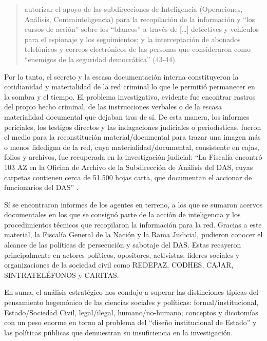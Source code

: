 \documentclass[
  spanish,
  11pt,
  a4paper,
]{scrbook}
\begin{document}
\begin{quote}
autorizar el apoyo de las subdirecciones de Inteligencia (Operaciones,
Análisis, Contrainteligencia) para la recopilación de la información y
``los cursos de acción'' sobre los ``blancos'' a través de {[}\ldots{]}
detectives y vehículos para el espionaje y los seguimientos; y la
interceptación de abonados telefónicos y correos electrónicos de las
personas que consideraron como ``enemigos de la seguridad democrática''
(43-44).
\end{quote}

Por lo tanto, el secreto y la escasa documentación interna constituyeron
la cotidianidad y materialidad de la red criminal lo que le permitió
permanecer en la sombra y el tiempo. El problema investigativo, evidente
fue encontrar rastros del propio hecho criminal, de las instrucciones
verbales o de la escasa materialidad documental que dejaban tras de sí.
De esta manera, los informes periciales, los testigos directos y las
indagaciones judiciales o periodísticas, fueron el medio para la
reconstitución material/documental para trazar una imagen más o menos
fidedigna de la red, cuya materialidad/documental, consistente en cajas,
folios y archivos, fue recuperada en la investigación judicial: ``La
Fiscalía encontró 103 AZ en la Oficina de Archivo de la Subdirección de
Análisis del DAS, cuyas carpetas contienen cerca de 51.500 hojas carta,
que documentan el accionar de funcionarios del DAS''
\autocite[35]{Martinez2016}.

Sí se encontraron informes de los agentes en terreno, a los que se
sumaron acervos documentales en los que se consignó parte de la acción
de inteligencia y los procedimientos técnicos que recopilaron la
información para la red. Gracias a este material, la Fiscalía General de
la Nación y la Rama Judicial, pudieron conocer el alcance de las
políticas de persecución y sabotaje del DAS. Estas recayeron
principalmente en actores políticos, opositores, activistas, líderes
sociales y organizaciones de la sociedad civil como REDEPAZ, CODHES,
CAJAR, SINTRATELÉFONOS y CARITAS.

En suma, el análisis estratégico nos condujo a superar las distinciones
típicas del pensamiento hegemónico de las ciencias sociales y políticas:
formal/institucional, Estado/Sociedad Civil, legal/ilegal,
humano/no-humano; conceptos y dicotomías con un peso enorme en torno al
problema del ``diseño institucional de Estado'' y las políticas públicas
que demuestran su insuficiencia en la investigación.
\end{document}
